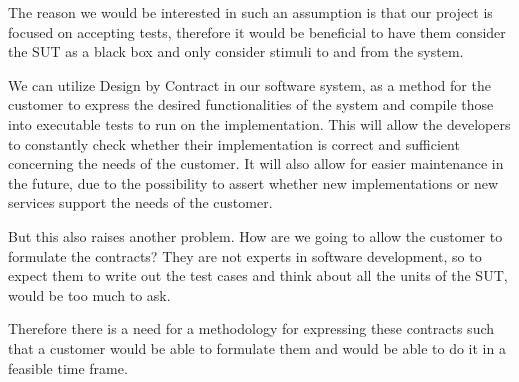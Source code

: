 The reason we would be interested in such an assumption is that our project is focused on accepting tests, therefore it would be beneficial to have them consider the SUT as a black box and only consider stimuli to and from the system.

We can utilize Design by Contract in our software system, as a method for the customer to express the desired functionalities of the system and compile those into executable tests to run on the implementation. 
This will allow the developers to constantly check whether their implementation is correct and sufficient concerning the needs of the customer. 
It will also allow for easier maintenance in the future, due to the possibility to assert whether new implementations or new services support the needs of the customer.

But this also raises another problem. 
How are we going to allow the customer to formulate the contracts? 
They are not experts in software development, so to expect them to write out the test cases and think about all the units of the SUT, would be too much to ask.

Therefore there is a need for a methodology for expressing these contracts such that a customer would be able to formulate them and would be able to do it in a feasible time frame.
